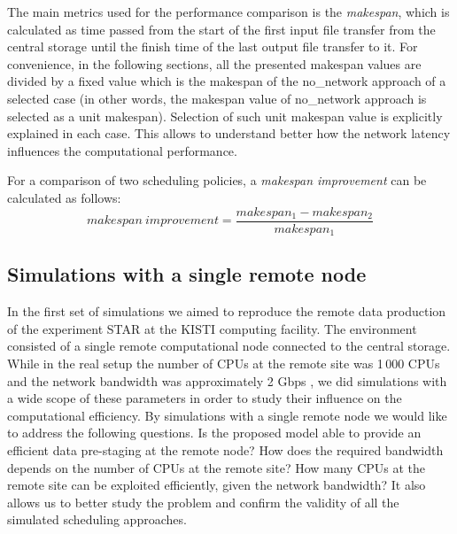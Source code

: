 \documentclass{svjour3}                     %
\begin{document}
The main metrics used for the performance comparison is the \textit{makespan}, which is calculated as time passed from the start of the first input file transfer from the central storage until the finish time of the last output file transfer to it. For convenience, in the following sections, all the presented makespan values are divided by a fixed value which is the makespan of the no\_network approach of a selected case (in other words, the makespan value of no\_network approach is selected as a unit makespan). Selection of such unit makespan value is explicitly explained in each case. This allows to understand better how the network latency influences the computational performance.

For a comparison of two scheduling policies, a \textit{makespan improvement} can be calculated as follows:
\begin{equation}
\label{makespanImprovement}
 makespan~improvement = \frac{makespan_{1} - makespan_{2}}{makespan_{1}} 
\end{equation}


\subsection{Simulations with a single remote node}
\label{1nodeSim}
In the first set of simulations we aimed to reproduce the remote data production of the experiment STAR at the KISTI computing facility. The environment consisted of a single remote computational node connected to the central storage. While in the real setup the number of CPUs at the remote site was 1\,000 CPUs and the network bandwidth was approximately 2 Gbps \cite{KISTI-production}, we did simulations with a wide scope of these parameters in order to study their influence on the computational efficiency. By simulations with a single remote node we would like to address the following questions. Is the proposed model able to provide an efficient data pre-staging at the remote node? How does the required bandwidth depends on the number of CPUs at the remote site? How many CPUs at the remote site can be exploited efficiently, given the network bandwidth? It also allows us to better study the problem and confirm the validity of all the simulated scheduling approaches.

\end{document}
